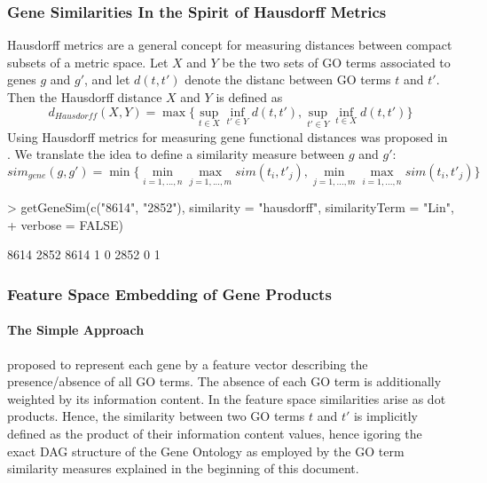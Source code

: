 \documentclass[12pt,a4paper]{article}
\begin{document}
\subsubsection{Gene Similarities In the Spirit of Hausdorff Metrics}

Hausdorff metrics are a general concept for measuring distances between compact subsets of a metric space. Let $X$ and $Y$ be the two sets of GO terms associated to genes $g$ and $g'$, and let $d(t,t')$ denote the distanc between GO terms $t$ and $t'$. Then the Hausdorff distance $X$ and $Y$ is defined as
\begin{equation}
d_{Hausdorff}(X,Y) = \max\{\sup_{t \in X} \inf_{t' \in Y} d(t,t'), \sup_{t' \in Y} \inf_{t \in X} d(t,t')  \}
\end{equation}
Using Hausdorff metrics for measuring gene functional distances was proposed in \cite{Pozo2008GOFuncSim}. We translate the idea to define a similarity measure between $g$ and $g'$:
\begin{equation}
sim_{gene}(g,g') = \min\{\min_{i=1,...,n} \max_{j=1,...,m} sim(t_{i},t'_{j}), \min_{j=1,...,m} \max_{i=1,...,n} sim(t_{i},t'_{j})  \}
\end{equation}
\begin{Schunk}
\begin{Sinput}
> getGeneSim(c("8614", "2852"), similarity = "hausdorff", similarityTerm = "Lin", 
+     verbose = FALSE)
\end{Sinput}
\begin{Soutput}
     8614 2852
8614    1    0
2852    0    1
\end{Soutput}
\end{Schunk}

\subsubsection{Feature Space Embedding of Gene Products}

\paragraph{The Simple Approach}

\cite{Mistry2008GOFuncSim} proposed to represent each gene by a feature vector describing the presence/absence of all GO terms. The absence of each GO term is additionally weighted by its information content. In the feature space similarities arise as dot products. Hence, the similarity between two GO terms $t$ and $t'$ is implicitly defined as the product of their information content values, hence igoring the exact DAG structure of the Gene Ontology as employed by the GO term similarity measures explained in the beginning of this document. 
\end{document}
